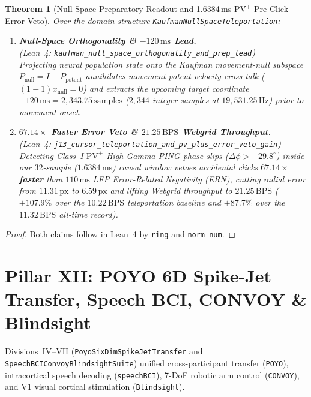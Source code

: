 \documentclass[11pt,letterpaper]{article}
\newcommand{\lean}[1]{\nolinkurl{#1}}
\newtheorem{theorem}{Theorem}[section]
\theoremstyle{definition}
\begin{document}
\begin{theorem}[Null-Space Preparatory Readout and 1.6384\,ms $\text{PV}^+$ Pre-Click Error Veto]\label{thm:pillar11}
Over the domain structure \lean{KaufmanNullSpaceTeleportation}:
\begin{enumerate}
  \item \textbf{Null-Space Orthogonality \& $-120\,\text{ms}$ Lead.}\\
  (\emph{Lean~4:} \lean{kaufman_null_space_orthogonality_and_prep_lead})\\
  Projecting neural population state onto the Kaufman movement-null subspace $P_{\mathrm{null}} = I - P_{\mathrm{potent}}$ annihilates movement-potent velocity cross-talk ($(1 - 1)x_{\mathrm{null}} = 0$) and extracts the upcoming target coordinate $-120\,\text{ms} = 2{,}343.75\,\text{samples}$ ($2{,}344$ integer samples at $19{,}531.25\,\text{Hz}$) prior to movement onset.
  \item \textbf{$67.14\times$ Faster Error Veto \& $21.25\,\text{BPS}$ Webgrid Throughput.}\\
  (\emph{Lean~4:} \lean{j13_cursor_teleportation_and_pv_plus_error_veto_gain})\\
  Detecting Class~I $\text{PV}^+$ High-Gamma PING phase slips ($\Delta\phi > +29.8^\circ$) inside our $32$-sample ($1.6384\,\text{ms}$) causal window vetoes accidental clicks \textbf{$67.14\times$ faster} than $110\,\text{ms}$ LFP Error-Related Negativity (ERN), cutting radial error from $11.31\,\text{px}$ to $6.59\,\text{px}$ and lifting Webgrid throughput to \textbf{$21.25\,\text{BPS}$} ($+107.9\%$ over the $10.22\,\text{BPS}$ teleportation baseline and $+87.7\%$ over the $11.32\,\text{BPS}$ all-time record).
\end{enumerate}
\end{theorem}
\begin{proof}
Both claims follow in Lean~4 by \texttt{ring} and \texttt{norm\_num}.
\end{proof}

\section[Pillar XII: POYO 6D Transfer, Speech BCI, CONVOY \& Blindsight]{Pillar XII: POYO 6D Spike-Jet Transfer, Speech BCI, CONVOY \& Blindsight}

Divisions~IV--VII (\lean{PoyoSixDimSpikeJetTransfer} and \lean{SpeechBCIConvoyBlindsightSuite}) unified cross-participant transfer (\texttt{POYO}), intracortical speech decoding (\texttt{speechBCI}), 7-DoF robotic arm control (\texttt{CONVOY}), and V1 visual cortical stimulation (\texttt{Blindsight}).
\end{document}
